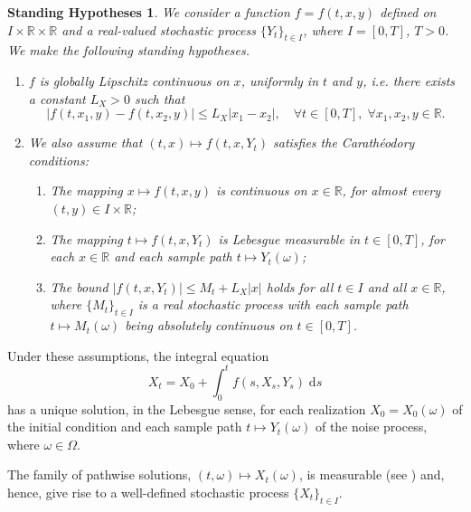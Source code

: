\documentclass[reqno,12pt]{amsart}
\theoremstyle{plain}%
\newtheorem{stdhyp}{Standing Hypotheses}[section]
\theoremstyle{definition}
\begin{document}
\begin{stdhyp}
    \label{standinghypotheses1}
    We consider a function $f=f(t, x, y)$ defined on $I\times \mathbb{R}\times\mathbb{R}$ and a real-valued stochastic process $\{Y_t\}_{t\in I}$, where $I=[0, T]$, $T > 0$. We make the following standing hypotheses.
    \begin{enumerate}
        \item $f$ is globally Lipschitz continuous on $x$, uniformly in $t$ and $y$, i.e. there exists a constant $L_X > 0$ such that
            \begin{equation}
                \label{Lxassumptionbasic}
                |f(t, x_1, y) - f(t, x_2, y)| \leq L_X |x_1 - x_2|, \quad \forall t \in [0, T], \;\forall x_1, x_2, y\in\mathbb{R}.
            \end{equation}

        \item We also assume that $(t, x) \mapsto f(t, x, Y_t)$ satisfies the Carath\'eodory conditions:
            \begin{enumerate}
                \item The mapping $x \mapsto f(t, x, y)$ is continuous on $x\in \mathbb{R}$, for almost every $(t, y)\in I\times \mathbb{R}$;
                \item The mapping $t \mapsto f(t, x, Y_t)$ is Lebesgue measurable in $t\in [0, T]$, for each $x\in \mathbb{R}$ and each sample path $t \mapsto Y_t(\omega)$;
                \item The bound $|f(t, x, Y_t)| \leq M_t + L_X|x|$ holds for all $t\in I$ and all $x\in\mathbb{R}$, where $\{M_t\}_{t\in I}$ is a real stochastic process with each sample path $t\mapsto M_t(\omega)$ being absolutely continuous on $t\in [0, T]$.
            \end{enumerate}
    \end{enumerate}
\end{stdhyp}

Under these assumptions, the integral equation
\begin{equation}
    \label{integralrodeform}
    X_t = X_0 + \int_0^t f(s, X_s, Y_s) \;\mathrm{d}s
\end{equation}
has a unique solution, in the Lebesgue sense, for each realization $X_0 = X_0(\omega)$ of the initial condition and each sample path $t\mapsto Y_t(\omega)$ of the noise process, where $\omega\in \Omega$.

The family of pathwise solutions, $(t, \omega) \mapsto X_t(\omega)$, is measurable (see \cite[Section 2.1.2]{HanKloeden2017}) and, hence, give rise to a well-defined stochastic process $\{X_t\}_{t\in I}$.
\end{document}
